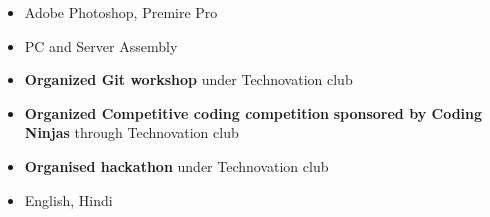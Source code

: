 
\begin{itemize}
\item Adobe Photoshop, Premire Pro 
\item PC and Server Assembly
\end{itemize}
\begin{itemize}
\item \textbf{Organized Git workshop} under Technovation club
\item \textbf{Organized Competitive coding competition} \textbf{sponsored by Coding Ninjas} through Technovation club
\item \textbf{Organised hackathon} under Technovation club
\end{itemize}
\begin{itemize}
\item English, Hindi
\end{itemize}

